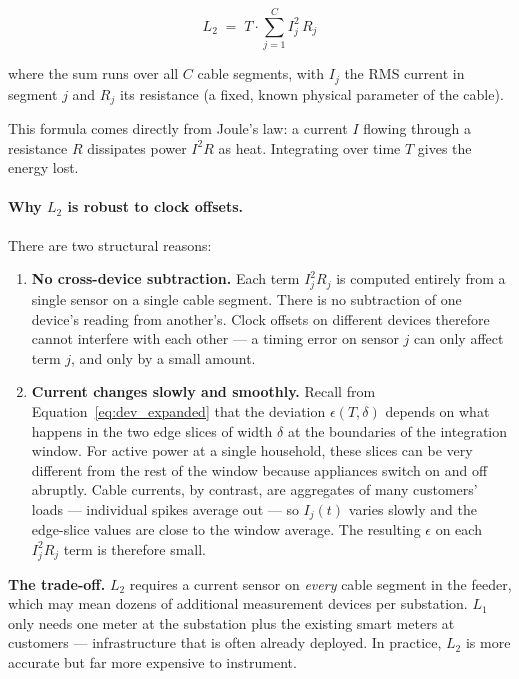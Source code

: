 \begin{equation}
  L_2
  \;=\;
  T \cdot \sum_{j=1}^{C} I_j^2\, R_j
  \label{eq:L2}
\end{equation}

where the sum runs over all $C$ cable segments, with $I_j$ the
RMS current in segment $j$ and $R_j$ its resistance (a fixed,
known physical parameter of the cable).

This formula comes directly from Joule's law: a current $I$
flowing through a resistance $R$ dissipates power $I^2 R$ as
heat. Integrating over time $T$ gives the energy lost.

\paragraph{Why $L_2$ is robust to clock offsets.}
There are two structural reasons:

\begin{enumerate}[leftmargin=2em, itemsep=5pt]
  \item \textbf{No cross-device subtraction.} Each term
        $I_j^2 R_j$ is computed entirely from a single sensor
        on a single cable segment. There is no subtraction of
        one device's reading from another's. Clock offsets on
        different devices therefore cannot interfere with each
        other --- a timing error on sensor $j$ can only affect
        term $j$, and only by a small amount.

  \item \textbf{Current changes slowly and smoothly.}
        Recall from Equation~\eqref{eq:dev_expanded} that the
        deviation $\epsilon(T,\delta)$ depends on what happens
        in the two edge slices of width $\delta$ at the
        boundaries of the integration window. For active power
        at a single household, these slices can be very
        different from the rest of the window because appliances
        switch on and off abruptly. Cable currents, by contrast,
        are aggregates of many customers' loads --- individual
        spikes average out --- so $I_j(t)$ varies slowly and
        the edge-slice values are close to the window average.
        The resulting $\epsilon$ on each $I_j^2 R_j$ term is
        therefore small.
\end{enumerate}

\begin{notebox}
\textbf{The trade-off.} $L_2$ requires a current sensor on
\emph{every} cable segment in the feeder, which may mean
dozens of additional measurement devices per substation. $L_1$
only needs one meter at the substation plus the existing smart
meters at customers --- infrastructure that is often already
deployed. In practice, $L_2$ is more accurate but far more
expensive to instrument.
\end{notebox}
 
